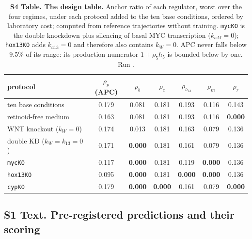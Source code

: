 \begin{table}[h]
\centering\footnotesize
\caption{\textbf{S4 Table. The design table.} Anchor ratio of each regulator,
worst over the four regimes, under each protocol added to the ten base
conditions, ordered by laboratory cost; computed from reference trajectories
without training. \texttt{mycKO} is the \bcat{} double knockdown plus silencing
of basal MYC transcription ($k_{aM}=0$); \texttt{hox13KO} adds $k_{a13}=0$ and
therefore also contains $k_W=0$. APC never falls below 9.5\% of its range: its
production numerator $1+\rho_5h_5$ is bounded below by one. Run
.}
\label{tab:reach}
\begin{tabular}{lcccccc}
\toprule
protocol & $\rho_{p}$ (APC) & $\rho_b$ & $\rho_c$ & $\rho_{h_{13}}$ & $\rho_m$ & $\rho_r$ \\
\midrule
ten base conditions & 0.179 & 0.081 & 0.181 & 0.193 & 0.116 & 0.143 \\
retinoid-free medium & 0.163 & 0.081 & 0.181 & 0.193 & 0.116 & \textbf{0.000} \\
WNT knockout ($k_W=0$) & 0.174 & 0.013 & 0.181 & 0.163 & 0.079 & 0.136 \\
\bcat{} double KD ($k_W=k_{13}=0$) & 0.171 & \textbf{0.000} & 0.181 & 0.161 & 0.079 & 0.136 \\
\texttt{mycKO} & 0.117 & \textbf{0.000} & 0.181 & 0.119 & \textbf{0.000} & 0.136 \\
\texttt{hox13KO} & 0.095 & \textbf{0.000} & 0.181 & \textbf{0.000} & \textbf{0.000} & 0.136 \\
\texttt{cypKO} & 0.179 & \textbf{0.000} & \textbf{0.000} & 0.161 & 0.079 & \textbf{0.000} \\
\bottomrule
\end{tabular}
\end{table}

\subsection*{S1 Text. Pre-registered predictions and their scoring}


